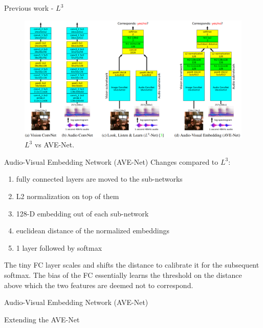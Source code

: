 \documentclass{beamer}
\begin{document}
\begin{frame}{Previous work - $L^3$}
\begin{figure}[h]
\includegraphics[width=\textwidth]{img/ave-net}
\caption{$L^3$ vs AVE-Net.}
\end{figure}

\end{frame}
\begin{frame}{Audio-Visual Embedding Network (AVE-Net)}
Changes compared to $L^3$:
\begin{enumerate}
\item fully connected layers are moved to the sub-networks
\item L2 normalization on top of them
\item 128-D embedding out of each sub-network
\item euclidean distance of the normalized embeddings
\item 1 layer followed by softmax 
\end{enumerate}

\vfill

The tiny FC layer scales and shifts the distance to
calibrate it for the subsequent softmax. The bias of the FC
essentially learns the threshold on the distance above which
the two features are deemed not to correspond.
\end{frame}
\begin{frame}{Audio-Visual Embedding Network (AVE-Net)}

 

\end{frame}
\begin{frame}{Extending the AVE-Net}


\end{frame}
\end{document}
